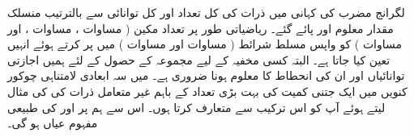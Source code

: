 لگرانج مضرب کی کہانی میں ذرات کی کل تعداد اور کل توانائی سے بالترتیب منسلک مقدار معلوم  اور  پائے گئے۔ ریاضیاتی طور پر تعداد مکین ( مساوات ، مساوات ، اور مساوات ) کو واپس مسلط شرائط ( مساوات  اور مساوات  ) میں پر کرتے ہوئے انہیں تعین کیا جاتا ہے۔ البتہ کسی مخفیہ کے لیے مجموعہ کے حصول کے لئے ہمیں اجازتی توانائیاں  اور ان کی انحطاط  کا معلوم ہونا ضروری ہے۔ میں سہ ابعادی لامتناہی چوکور کنویں میں ایک جتنی کمیت کی بہت بڑی تعداد کے باہم غیر متعامل ذرات کی  کی مثال لیتے ہوئے آپ کو اس ترکیب سے متعارف کرتا ہوں۔ اس سے ہم پر  اور  کی طبیعی مفہوم عیاں ہو گی۔ 

